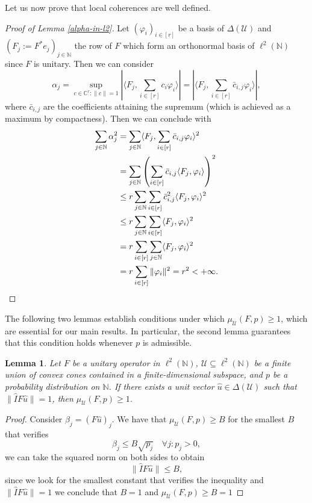 \documentclass[a4paper,oneside]{amsart}
\newtheorem{lemma}[theorem]{Lemma}
\newcommand{\lnn}{\ell^2(\mathbb{N})}
\begin{document}
    Let us now prove that local coherences are well defined.
    \begin{proof}[Proof of Lemma \ref{alpha-in-l2}]
        Let $(\varphi_i)_{i\in[r]}$ be a basis of $\Delta(\mathcal{U})$ and $(F_j := F^* e_j)_{j\in\mathbb{N}}$ the row of $F$ which form an orthonormal basis of $\lnn$ since $F$ is unitary. Then we can consider
        \begin{equation*}
            \alpha_j = \sup_{c\in\mathbb{C}^r \colon \|c\|=1} |\langle F_j , \sum_{i\in[r]}c_i\varphi_i\rangle| = |\langle F_j , \sum_{i\in[r]}\bar{c}_{i,j}\varphi_i\rangle|,
        \end{equation*}
        where $\bar{c}_{i,j}$ are the coefficients attaining the supremum (which is achieved as a maximum by compactness). Then we can conclude with
        \begin{align*}
            \sum_{j\in\mathbb{N}} \alpha_j^2 & = \sum_{j\in\mathbb{N}} \langle F_j , \sum_{i\in[r]}\bar{c}_{i,j}\varphi_i\rangle^2 \\
            &= \sum_{j\in\mathbb{N}} \left(\sum_{i\in[r]}\bar{c}_{i,j}\langle F_j , \varphi_i\rangle\right)^2 \\
            & \leq r\sum_{j\in\mathbb{N}} \sum_{i\in[r]}\bar{c}_{i,j}^2\langle F_j , \varphi_i\rangle^2 \\
            & \leq r\sum_{j\in\mathbb{N}} \sum_{i\in[r]}\langle F_j , \varphi_i\rangle^2 \\
            &= r\sum_{i\in[r]}\sum_{j\in\mathbb{N}}\langle F_j , \varphi_i\rangle^2 \\
            &= r\sum_{i\in[r]} \| \varphi_i \|^2 = r^2 <+\infty. \qedhere
        \end{align*}
    \end{proof}
The following two lemmas establish conditions under which $\mu_\mathcal{U}(F,p) \geq 1$, which are essential for our main results. In particular, the second lemma guarantees that this condition holds whenever $p$ is admissible.

\begin{lemma}\label{non-admiss>1}
    Let $F$ be a unitary operator in $\lnn$, $\mathcal{U} \subseteq \lnn$ be a finite union of convex cones contained in a finite-dimensional subspace, and $p$ be a probability distribution on $\mathbb{N}$. If there exists a unit vector $\hat{u} \in \Delta(\mathcal{U})$ such that $\| \hat{I} F\hat{u} \| = 1$, then $\mu_\mathcal{U}(F,p) \geq 1$.
\end{lemma}
\begin{proof}
    Consider $\beta_j = (F\hat{u})_j$. We have that $\mu_{\mathcal{U}}(F,p)\geq B$ for the smallest $B$ that verifies
    \begin{equation*}
        \beta_j \leq B\sqrt{p_j} \quad \forall j\colon p_j>0,
    \end{equation*}
    we can take the squared norm on both sides to obtain
    \begin{equation*}
        \| \hat{I} F\hat{u} \| \leq B,
    \end{equation*}
    since we look for the smallest constant that verifies the inequality and $\| \hat{I} F\hat{u} \|=1$ we conclude that $B=1$ and $\mu_{\mathcal{U}}(F,p) \geq B =1$
\end{proof}
\end{document}
